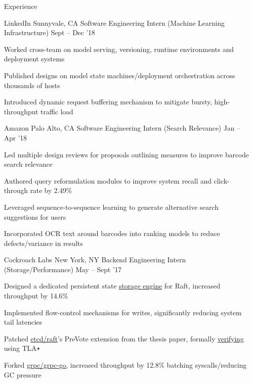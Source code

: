 \documentclass{resume} %
\begin{document}
\begin{rSection}{Experience}
  \begin{rWorkSection}{LinkedIn}
                      {Sunnyvale, CA}
                      {Software Engineering Intern (Machine Learning Infrastructure)}
                      {Sept -- Dec '18}
    \item Worked cross-team on model serving, versioning, runtime environments and
      deployment systems
    \item Published designs on model state
      machines/deployment orchestration across thousands of hosts
    \item Introduced dynamic request buffering mechanism to mitigate bursty,
      high-throughput traffic load
  \end{rWorkSection}

  \begin{rWorkSection}{Amazon}
                     {Palo Alto, CA}
                     {Software Engineering Intern (Search Relevance)}
                     {Jan -- Apr '18}
    \item Led multiple design reviews for proposals outlining measures to
      improve barcode search relevance
    \item Authored query reformulation modules to improve system recall and
      click-through rate by 2.49\%
    \item Leveraged sequence-to-sequence learning to generate alternative
      search suggestions for users
    \item Incorporated OCR text around barcodes into ranking models to reduce
      defects/variance in results
  \end{rWorkSection}

  \begin{rWorkSection}{Cockroach Labs}
                     {New York, NY}
                     {Backend Engineering Intern (Storage/Performance)}
                     {May -- Sept '17}
    \item Designed a dedicated persistent state
      \href{https://github.com/cockroachdb/cockroach/pull/16361}{\underline
      {storage engine}} for Raft, increased throughput by 14.6\%
    \item Implemented flow-control mechanisms for writes, significantly reducing
      system tail latencies
    \item Patched
      \href{https://github.com/coreos/etcd/pull/8288}{\underline{etcd/raft}}'s
      PreVote extension from the thesis paper, formally
      \href{https://github.com/irfansharif/raft.tla/commit/22b05818b6bcfe6719a708f2270a1308fecbc0fa}{\underline {verifying}}
      using TLA\texttt{+}
    \item Forked \href{https://github.com/irfansharif/grpc-go}{\underline{grpc/grpc-go}},
      increased throughput by 12.8\% batching syscalls/reducing GC pressure
  \end{rWorkSection}


\end{rSection}
\end{document}
